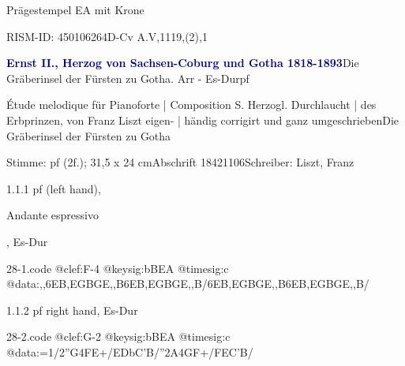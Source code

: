 \documentclass[a4paper, twocolumn, 11pt]{book}
\begin{document}
\newline %
\par Prägestempel {\textquotedbl}EA{\textquotedbl} mit Krone
\par RISM-ID: 450106264\newline D-Cv  A.V,1119,(2),1
\par \vspace{16pt} \textcolor{darkblue}{\textbf{Ernst II., Herzog von Sachsen-Coburg und Gotha  1818-1893}}\hfillplus{[28]}\newline Die Gräberinsel der Fürsten zu Gotha. Arr - Es-Dur\newline pf
\par \begin{itshape} Étude melodique für Pianoforte | Composition S. Herzogl. Durchlaucht | des Erbprinzen, von Franz Liszt eigen- | händig corrigirt und ganz umgeschrieben Die Gräberinsel der Fürsten zu Gotha\end{itshape} 
\par \textcolor{darkblue}{}  Stimme: pf  (2f.); 31,5 x 24 cm\newline Abschrift  18421106\newline Schreiber: Liszt, Franz
\par 1.1.1  pf (left hand), \begin{itshape}Andante espressivo\end{itshape}, Es-Dur  
\begin{filecontents*}{28-1.code}
@clef:F-4
@keysig:bBEA
@timesig:c
@data:,,{6EB,EGBGE,,B}{6EB,EGBGE,,B}/{6EB,EGBGE,,B}{6EB,EGBGE,,B}/
\end{filecontents*}

\newline %
\par 1.1.2  pf right hand, Es-Dur  
\begin{filecontents*}{28-2.code}
@clef:G-2
@keysig:bBEA
@timesig:c
@data:=1/2''G4FE+/EDbC'B/''2A4GF+/FEC'B/
\end{filecontents*}
\end{document}
